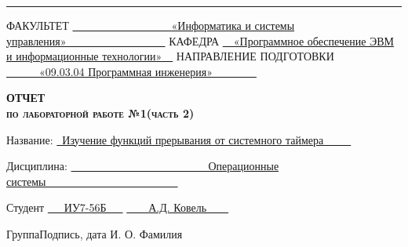 \begin{titlepage}
\noindent\rule{18cm}{1.5pt}

\vspace{8mm}

\noindent\textnormal{ФАКУЛЬТЕТ}\hspace{5mm} \underline{\textnormal{~~~~~~~~~~~~~~~~~~«Информатика и системы управления»~~~~~~~~~~~~~~~~~~}} \newline\newline
\textnormal{КАФЕДРА}\hspace{5mm} \underline{\textnormal{~~«Программное обеспечение ЭВМ и информационные технологии»~~}}
\newline\newline
\textnormal{НАПРАВЛЕНИЕ ПОДГОТОВКИ}\hspace{5mm} \underline{\textnormal{~~~~~~«09.03.04 Программная инженерия»~~~~~~~~}}

\vspace{2.5cm}

\begin{center}
	\Large\textbf{\textsc{ОТЧЕТ}}\\
	\Large\textbf{\textsc{по лабораторной работе №1(часть 2)}}\\
\end{center}

\vspace{1cm}

\noindent\textnormal{Название:} \hspace{15mm} \underline{\textnormal{~Изучение функций прерывания от системного таймера~~~~~}}\noindent

\vspace{1.3cm}

\noindent\textnormal{Дисциплина:} \hspace{10mm} \underline{\textnormal{~~~~~~~~~~~~~~~~~~~~~~~~~Операционные системы~~~~~~~~~~~~~~~~~~~~~~~~}}\noindent

\vspace{2cm}

\noindent\textnormal{Студент} \hspace{17mm}
\underline{\textnormal{{~~~ИУ7-56Б~~~}}}
\hspace{20mm}
\underline{\textnormal{\hphantom{~~~~~~~~~~~~~~~~~~~~~~~~~~~}}} \hspace{15mm}
\underline{\textnormal{~~~~А.Д. Ковель~~~~}}

\vspace{2mm}
\noindent\textnormal{\hphantom{Студент}} \hspace{23mm}\noindent
\fontsize{8pt}{8pt}
\textnormal{Группа}\hspace{40mm}\textnormal{Подпись, дата} \hspace{30mm}\noindent\textnormal{И. О. Фамилия}


\end{titlepage}

